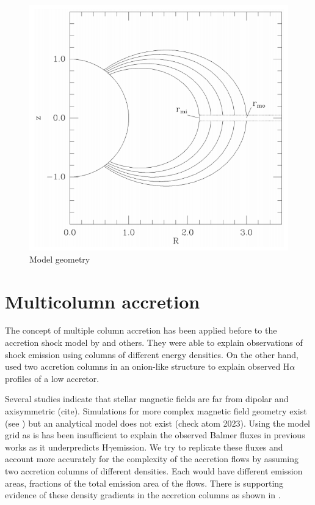 \documentclass[twocolumn,linenumbers]{aastex631}
\newcommand{\halpha}{H$\alpha$}
\newcommand{\hgamma}{H$\gamma$}
\begin{document}
\begin{figure}
    \centering
    \includegraphics[width=0.75\linewidth]{figures/geometry.png}
    \caption{Model geometry}
    \label{fig:model_geometry}
\end{figure}

\section{Multicolumn accretion}


The concept of multiple column accretion has been applied before to the accretion shock model by \citet{pittman2022} and others. They were able to explain observations of shock emission using columns of different energy densities. On the other hand, \citet{atom2019b} used two accretion columns in an onion-like structure to explain observed \halpha profiles of a low accretor.

Several studies indicate that stellar magnetic fields are far from dipolar and axisymmetric (cite). Simulations for more complex magnetic field geometry exist (see \citet{romanova2003}) but an analytical model does not exist (check atom 2023). Using the model grid as is has been insufficient to explain the observed Balmer fluxes in previous works \citep{micolta2023} as it underpredicts \hgamma emission. We try to replicate these fluxes and account more accurately for the complexity of the accretion flows by assuming two accretion columns of different densities. Each would have different emission areas, fractions of the total emission area of the flows. There is supporting evidence of these density gradients in the accretion columns as shown in \citet{zhaohuan2024}.
\end{document}
